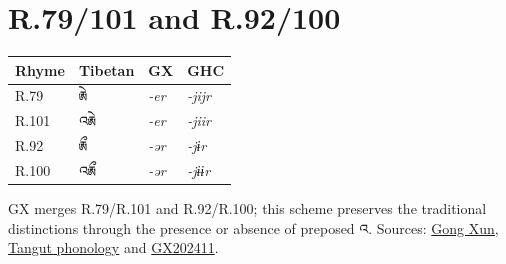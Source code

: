 \documentclass[12pt]{nextart}
\begin{document}
\section{R.79/101 and R.92/100}
\begin{center}\begin{tabular}{llll}\toprule Rhyme & Tibetan & GX & GHC \\\midrule
R.79 & རྸེ & \emph{-er} & \emph{-jijr} \\ R.101 & འརྸེ & \emph{-er} & \emph{-jiir} \\ R.92 & རྸྀ & \emph{-ər} & \emph{-jɨr} \\ R.100 & འརྸྀ & \emph{-ər} & \emph{-jɨɨr} \\\bottomrule
\end{tabular}\end{center}

GX merges R.79/R.101 and R.92/R.100; this scheme preserves the traditional distinctions through the presence or absence of preposed འ. Sources: \href{https://homepage.univie.ac.at/xun.gong/tangut/phonology-202409.html}{Gong Xun, Tangut phonology} and \href{https://semakosa.github.io/tangut-pronunciation-db/docs/GX202411-zh.html}{GX202411}.
\end{document}
